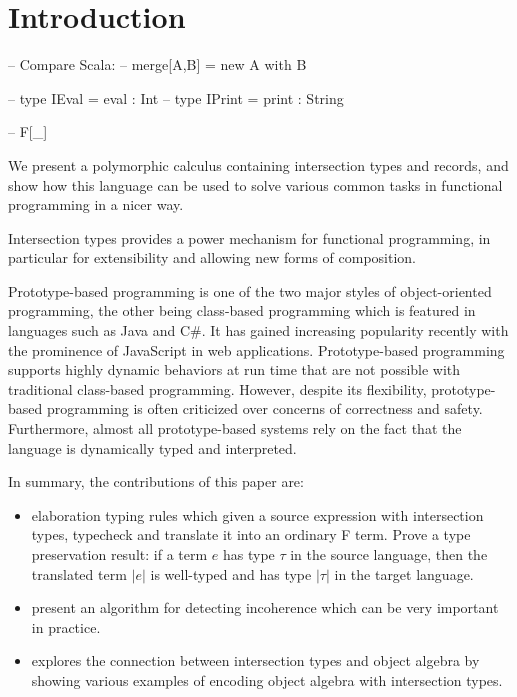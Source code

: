 \section{Introduction}

-- Compare Scala:
-- merge[A,B] = new A with B

-- type IEval  = { eval :  Int }
-- type IPrint = { print : String }

-- F[\_]

We present a polymorphic calculus containing intersection types and records, and show
how this language can be used to solve various common tasks in functional
programming in a nicer way.

Intersection types provides a power mechanism for functional programming, in
particular for extensibility and allowing new forms of composition.

Prototype-based programming is one of the two major styles of object-oriented
programming, the other being class-based programming which is featured in
languages such as Java and C\#. It has gained increasing popularity recently
with the prominence of JavaScript in web applications. Prototype-based
programming supports highly dynamic behaviors at run time that are not possible
with traditional class-based programming. However, despite its flexibility,
prototype-based programming is often criticized over concerns of correctness and
safety. Furthermore, almost all prototype-based systems rely on the fact that
the language is dynamically typed and interpreted.

In summary, the contributions of this paper are:

\begin{itemize}

\item{elaboration typing rules which given a source expression with intersection
    types, typecheck and translate it into an ordinary F term. Prove a type
    preservation result: if a term $e$ has type $\tau$ in the source language,
    then the translated term $|e|$ is well-typed and has type $|\tau|$ in the
    target language.}

\item{present an algorithm for detecting incoherence which can be very important
    in practice.}

\item{explores the connection between intersection types and object algebra by
    showing various examples of encoding object algebra with intersection
    types.}

\end{itemize}
